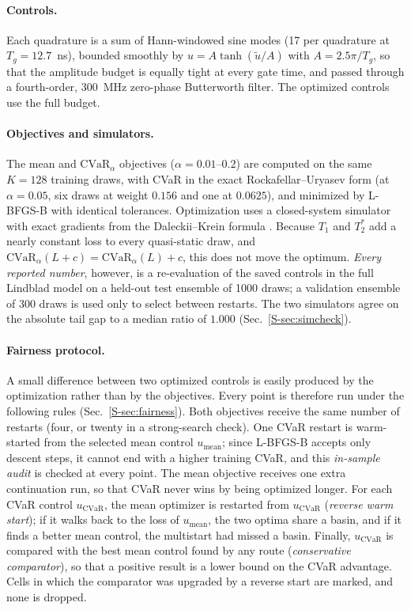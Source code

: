 \documentclass[aps,pra,twocolumn,superscriptaddress,reprint,nofootinbib,floatfix]{revtex4-2}
\theoremstyle{definition}
\newcommand{\cvar}{\mathrm{CVaR}}
\newcommand{\umean}{u_{\mathrm{mean}}}
\newcommand{\ucvar}{u_{\cvar}}
\newcommand{\sref}[1]{Sec.~\ref{S-#1}}
\begin{document}
\paragraph*{Controls.} Each quadrature is a sum of Hann-windowed sine modes
(17 per quadrature at $T_g=12.7$~ns), bounded smoothly by
$u=A\tanh(\tilde u/A)$ with $A=2.5\pi/T_g$, so that the amplitude budget is
equally tight at every gate time, and passed through a fourth-order,
300~MHz zero-phase Butterworth filter. The optimized controls use the full
budget.

\paragraph*{Objectives and simulators.} The mean and $\cvar_\alpha$
objectives ($\alpha=0.01$--$0.2$) are computed on the same $K=128$ training
draws, with CVaR in the exact Rockafellar--Uryasev form (at $\alpha=0.05$,
six draws at weight $0.156$ and one at $0.0625$), and minimized by L-BFGS-B
\cite{Byrd1995} with identical tolerances. Optimization uses a closed-system
simulator with exact gradients from the Daleckii--Krein formula
\cite{Higham2008}. Because $T_1$ and $T_2^*$ add a nearly constant loss to
every quasi-static draw, and $\cvar_\alpha(L+c)=\cvar_\alpha(L)+c$, this does
not move the optimum. \emph{Every reported number}, however, is a
re-evaluation of the saved controls in the full Lindblad model on a held-out
test ensemble of 1000 draws; a validation ensemble of 300 draws is used only
to select between restarts. The two simulators agree on the absolute tail gap
to a median ratio of $1.000$ (\sref{sec:simcheck}).

\paragraph*{Fairness protocol.} A small difference between two optimized
controls is easily produced by the optimization rather than by the
objectives. Every point is therefore run under the following rules
(\sref{sec:fairness}). Both objectives receive the same number of restarts
(four, or twenty in a strong-search check). One CVaR restart is warm-started
from the selected mean control $\umean$; since L-BFGS-B accepts only descent
steps, it cannot end with a higher training CVaR, and this \emph{in-sample
audit} is checked at every point. The mean objective receives one extra
continuation run, so that CVaR never wins by being optimized longer. For each
CVaR control $\ucvar$, the mean optimizer is restarted from $\ucvar$
(\emph{reverse warm start}); if it walks back to the loss of $\umean$, the two
optima share a basin, and if it finds a better mean control, the multistart
had missed a basin. Finally, $\ucvar$ is compared with the best mean control
found by any route (\emph{conservative comparator}), so that a positive
result is a lower bound on the CVaR advantage. Cells in which the comparator
was upgraded by a reverse start are marked, and none is dropped.
\end{document}
